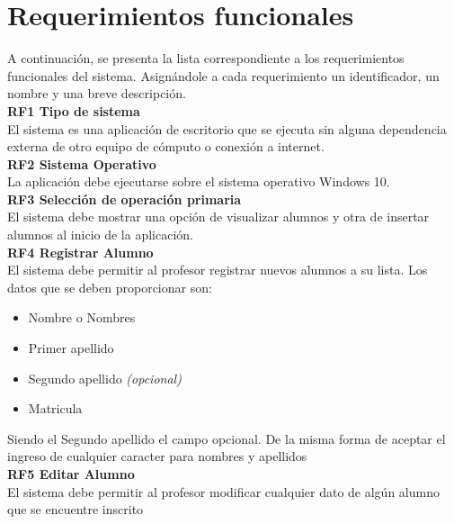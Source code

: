 \section{Requerimientos funcionales}


A continuación, se presenta la lista correspondiente a los requerimientos funcionales del sistema. Asignándole a cada requerimiento un identificador, un nombre y una breve descripción.\\


\textbf{RF1 \hspace{2cm}Tipo de sistema}\\
El sistema es una aplicación de escritorio que se ejecuta sin alguna dependencia externa de otro equipo de cómputo o conexión a internet.\\

\textbf{RF2 \hspace{2cm}Sistema Operativo}\\
La aplicación debe ejecutarse sobre el sistema operativo Windows 10.\\

\textbf{RF3 \hspace{2cm}Selección de operación primaria}\\
El sistema debe mostrar una opción de visualizar alumnos y otra de insertar alumnos al inicio de la aplicación.\\

\textbf{RF4 \hspace{2cm}Registrar Alumno}\\
El sistema debe permitir al profesor registrar nuevos alumnos a su lista. Los datos que se deben proporcionar son:
\begin{itemize}
	\item Nombre o Nombres
	\item Primer apellido
	\item Segundo apellido \textit{(opcional)}
	\item Matricula
\end{itemize}
Siendo el Segundo apellido el campo opcional. De la misma forma de aceptar el ingreso de cualquier caracter para nombres y apellidos\\

\textbf{RF5 \hspace{2cm}Editar Alumno}\\
El sistema debe permitir al profesor modificar cualquier dato de algún alumno que se encuentre inscrito\\

